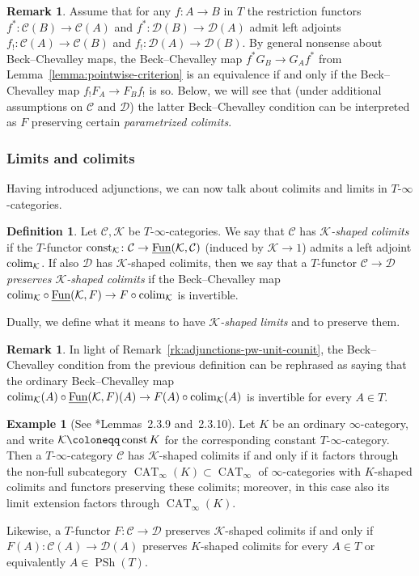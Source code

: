 \documentclass[reqno]{memo-l}
\theoremstyle{mythm}
\theoremstyle{definition}
\newtheorem{rk}[thm]{Remark}
\newtheorem{ex}[thm]{Example}
\newtheorem{definition}[thm]{Definition}
\numberwithin{equation}{section}
\newcommand{\Cc}{{\mathcal{C}}}
\newcommand{\Dd}{{\mathcal{D}}}
\newcommand{\Kk}{{\mathcal{K}}}
\DeclareMathOperator{\CAT}{CAT}
\newcommand{\Fun}{{\textup{Fun}}}
\DeclareMathOperator{\PSh}{PSh}
\newcommand{\colim}{\mathop{\textup{colim}}}
\newcommand{\const}{\textup{const}}
\newcommand{\ulhelper}[2]{\underline{\setbox0=\hbox{$#1#2$}\dp0=0.4pt \box0\relax}}
\newcommand{\ul}[1]{{\mathpalette\ulhelper{#1}}\hbox{\rule[-2pt]{0pt}{0pt}}}
\begin{document}
\begin{rk}\label{rk:adj-via-colims}
    Assume that for any $f\colon A\to B$ in $T$ the restriction functors $f^*\colon\Cc(B)\to\Cc(A)$ and $f^*\colon\Dd(B)\to\Dd(A)$ admit left adjoints $f_!\colon\Cc(A)\to\Cc(B)$ and $f_!\colon\Dd(A)\to\Dd(B)$. By general nonsense about Beck--Chevalley maps, the Beck--Chevalley map $f^*G_B\to G_Af^*$ from Lemma~\ref{lemma:pointwise-criterion} is an equivalence if and only if the Beck--Chevalley map $f_!F_A\to F_Bf_!$ is so. Below, we will see that (under additional assumptions on $\Cc$ and $\Dd$) the latter Beck--Chevalley condition can be interpreted as $F$ preserving certain \emph{parametrized colimits}.
\end{rk}

\subsubsection{Limits and colimits}\label{subsubsec:colimits} Having introduced adjunctions, we can now talk about colimits and limits in $T$-$\infty$-categories.

\begin{definition}
    Let $\Cc,\Kk$ be $T$-$\infty$-categories. We say that $\Cc$ has \emph{$\Kk$-shaped colimits} if the $T$-functor $\const_{\Kk}\colon\Cc\to\ul\Fun(\Kk,\Cc)$ (induced by $\Kk\to 1$) admits a left adjoint $\colim_\Kk$. If also $\Dd$ has $\Kk$-shaped colimits, then we say that a $T$-functor $\Cc\to\Dd$ \emph{preserves $\Kk$-shaped colimits} if the Beck--Chevalley map ${\colim_\Kk}\circ{\ul\Fun(\Kk,F)}\to F\circ{\colim_\Kk}$ is invertible. 

    Dually, we define what it means to have \emph{$\Kk$-shaped limits} and to preserve them.
\end{definition}

\begin{rk}
    In light of Remark~\ref{rk:adjunctions-pw-unit-counit}, the Beck--Chevalley condition from the previous definition can be rephrased as saying that the ordinary Beck--Chevalley map $\colim_\Kk(A)\circ\ul\Fun(\Kk,F)(A)\to F(A)\circ\colim_\Kk(A)$ is invertible for every $A\in T$.
\end{rk}

\begin{ex}[See \cite{CLL_Global}*{Lemmas~2.3.9 and~2.3.10}]\label{ex:existenceconstantcolimits}
    Let $K$ be an ordinary $\infty$-category, and write $\Kk\coloneqq\mathop\const K$ for the corresponding constant $T$-$\infty$-category. Then a $T$-$\infty$-category $\Cc$ has $\Kk$-shaped colimits if and only if it factors through the non-full subcategory $\CAT_\infty(K)\subset\CAT_\infty$ of $\infty$-categories with $K$-shaped colimits and functors preserving these colimits; moreover, in this case also its limit extension factors through $\CAT_\infty(K)$.

    Likewise, a $T$-functor $F\colon\Cc\to\Dd$ preserves $\Kk$-shaped colimits if and only if $F(A)\colon\Cc(A)\to\Dd(A)$ preserves $K$-shaped colimits for every $A\in T$ or equivalently $A\in\PSh(T)$.
\end{ex}
\end{document}
